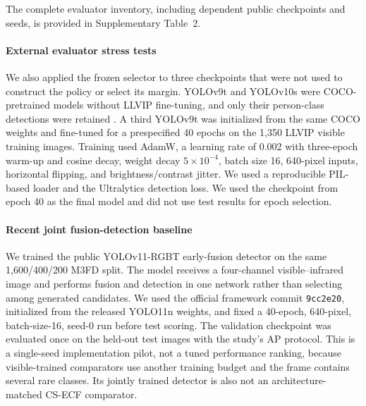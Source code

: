 \documentclass[preprint,11pt]{elsarticle}
\begin{document}
The complete evaluator inventory, including dependent public checkpoints and
seeds, is provided in Supplementary Table~2.

\paragraph{External evaluator stress tests}
We also applied the frozen selector to three checkpoints that were not used to
construct the policy or select its margin. YOLOv9t and YOLOv10s were
COCO-pretrained models without LLVIP fine-tuning, and only their person-class
detections were retained \cite{wang2024yolov9,wang2024yolov10}. A third
YOLOv9t was initialized from the same COCO weights and fine-tuned for a
prespecified 40 epochs on the 1,350 LLVIP visible training images. Training
used AdamW, a learning rate of 0.002 with three-epoch warm-up and cosine decay,
weight decay \(5\times10^{-4}\), batch size 16, 640-pixel inputs, horizontal
flipping, and brightness/contrast jitter. We used a reproducible PIL-based
loader and the Ultralytics detection loss. We used the checkpoint from epoch 40
as the final model and did not use test results for epoch selection.

\paragraph{Recent joint fusion-detection baseline}
We trained the public YOLOv11-RGBT early-fusion detector
\cite{wan2025yolo11rgbt} on the same 1,600/400/200 M3FD split. The model
receives a four-channel visible--infrared image and performs fusion and
detection in one network rather than selecting among generated candidates. We
used the official framework commit \texttt{9cc2e20}, initialized from the
released YOLO11n weights, and fixed a 40-epoch, 640-pixel, batch-size-16, seed-0
run before test scoring. The validation checkpoint was evaluated once on the
held-out test images with the study's AP protocol. This is a single-seed
implementation pilot, not a tuned performance ranking, because visible-trained
comparators use another training budget and the frame contains several rare
classes. Its jointly trained detector is also not an architecture-matched
CS-ECF comparator.
\end{document}
